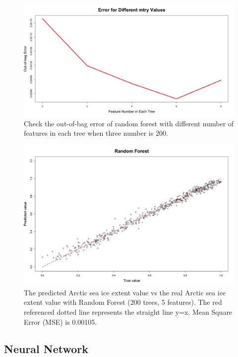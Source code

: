 \begin{figure}[htbp]
\centering
\includegraphics[width = 1.0\textwidth]{Figure/4.2.6-RF-5Features.png}
\caption{Check the out-of-bag error of random forest with different number of features in each tree when three number is 200.}
\label{4.2.6-RF-5Features}
\end{figure}

\begin{figure}[htbp]
\centering
\includegraphics[width = 1.0\textwidth]{Figure/4.2.6-RF.png}
\caption{The predicted Arctic sea ice extent value vs the real Arctic sea ice extent value with Random Forest (200 trees, 5 features). The red referenced dotted line represents the straight line y=x. Mean Square Error (MSE) is 0.00105.}
\label{4.2.6-RF}
\end{figure}



\subsection{Neural Network} %


